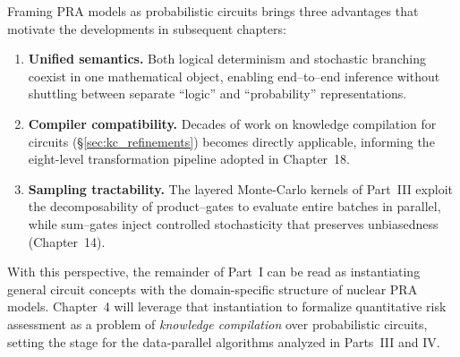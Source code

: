 Framing PRA models as probabilistic circuits brings three advantages that motivate the developments in subsequent chapters:
\begin{enumerate}[label=(\alph*)]
  \item \textbf{Unified semantics.}  Both logical determinism and stochastic branching coexist in one mathematical object, enabling end–to–end inference without shuttling between separate ``logic'' and ``probability'' representations.
  \item \textbf{Compiler compatibility.}  Decades of work on knowledge compilation for circuits (\S\ref{sec:kc_refinements}) becomes directly applicable, informing the eight-level transformation pipeline adopted in Chapter~18.
  \item \textbf{Sampling tractability.}  The layered Monte-Carlo kernels of Part~III exploit the decomposability of product–gates to evaluate entire batches in parallel, while sum–gates inject controlled stochasticity that preserves unbiasedness (Chapter~14).
\end{enumerate}

With this perspective, the remainder of Part~I can be read as instantiating general circuit concepts with the domain-specific structure of nuclear PRA models.  Chapter~4 will leverage that instantiation to formalize quantitative risk assessment as a problem of \emph{knowledge compilation} over probabilistic circuits, setting the stage for the data-parallel algorithms analyzed in Parts~III and IV.